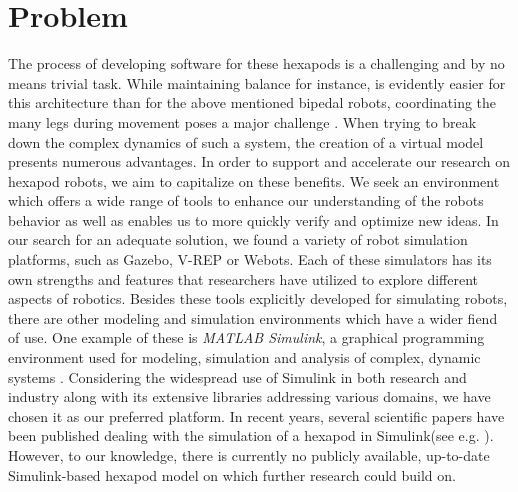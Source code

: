 \section{Problem}
The process of developing software for these hexapods is a challenging and by no means trivial task.
While maintaining balance for instance, is evidently easier for this architecture than for the above mentioned bipedal robots, coordinating the many legs during movement poses a major challenge \parencite{azayev2020blind,schilling2013walknet}.
When trying to break down the complex dynamics of such a system, the creation of a virtual model presents numerous advantages.
In order to support and accelerate our research on hexapod robots, we aim to capitalize on these benefits.
We seek an environment which offers a wide range of tools to enhance our understanding of the robots behavior as well as enables us to more quickly verify and optimize new ideas.
In our search for an adequate solution, we found a variety of robot simulation platforms, such as Gazebo, V-REP or Webots. 
Each of these simulators has its own strengths and features that researchers have utilized to explore different aspects of robotics\parencite{de2019analysis}.
Besides these tools explicitly developed for simulating robots, there are other modeling and simulation environments which have a wider fiend of use.
One example of these is \textit{MATLAB Simulink\textsuperscript{\textregistered}}, a graphical programming environment used for modeling, simulation and analysis of complex, dynamic systems \parencite{Simulink}.
Considering the widespread use of Simulink in both research and industry along with its extensive libraries addressing various domains, we have chosen it as our preferred platform.
In recent years, several scientific papers have been published dealing with the simulation of a hexapod in Simulink(see e.g. \cite{tanaka2019development, barai2013smart, atify2019propelling}).
However, to our knowledge, there is currently no publicly available, up-to-date Simulink-based hexapod model on which further research could build on.


